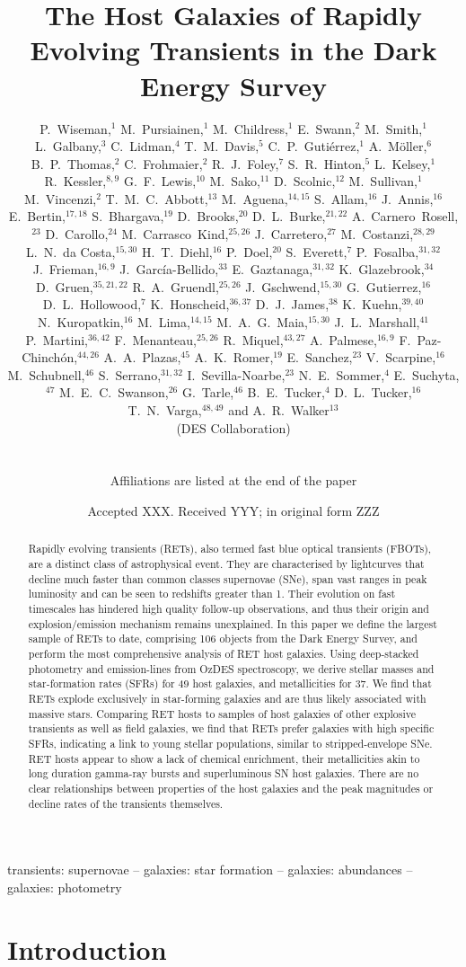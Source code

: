 \documentclass[fleqn,usenatbib,]{mnras}
\title[RET host galaxies in DES]{The Host Galaxies of Rapidly Evolving Transients in the Dark Energy Survey}
\author[P. S. Wiseman]{
\parbox{\textwidth}{
\Large
P.~Wiseman,$^{1}$
M.~Pursiainen,$^{1}$
M.~Childress,$^{1}$
E.~Swann,$^{2}$
M.~Smith,$^{1}$
L.~Galbany,$^{3}$
C.~Lidman,$^{4}$
T.~M.~Davis,$^{5}$
C.~P.~Guti\'errez,$^{1}$
A.~M\"oller,$^{6}$
B.~P.~Thomas,$^{2}$
C.~Frohmaier,$^{2}$
R.~J.~Foley,$^{7}$
S.~R.~Hinton,$^{5}$
L.~Kelsey,$^{1}$
R.~Kessler,$^{8,9}$
G.~F.~Lewis,$^{10}$
M.~Sako,$^{11}$
D.~Scolnic,$^{12}$
M.~Sullivan,$^{1}$
M.~Vincenzi,$^{2}$
T.~M.~C.~Abbott,$^{13}$
M.~Aguena,$^{14,15}$
S.~Allam,$^{16}$
J.~Annis,$^{16}$
E.~Bertin,$^{17,18}$
S.~Bhargava,$^{19}$
D.~Brooks,$^{20}$
D.~L.~Burke,$^{21,22}$
A.~Carnero~Rosell,$^{23}$
D.~Carollo,$^{24}$
M.~Carrasco~Kind,$^{25,26}$
J.~Carretero,$^{27}$
M.~Costanzi,$^{28,29}$
L.~N.~da Costa,$^{15,30}$
H.~T.~Diehl,$^{16}$
P.~Doel,$^{20}$
S.~Everett,$^{7}$
P.~Fosalba,$^{31,32}$
J.~Frieman,$^{16,9}$
J.~Garc\'ia-Bellido,$^{33}$
E.~Gaztanaga,$^{31,32}$
K.~Glazebrook,$^{34}$
D.~Gruen,$^{35,21,22}$
R.~A.~Gruendl,$^{25,26}$
J.~Gschwend,$^{15,30}$
G.~Gutierrez,$^{16}$
D.~L.~Hollowood,$^{7}$
K.~Honscheid,$^{36,37}$
D.~J.~James,$^{38}$
K.~Kuehn,$^{39,40}$
N.~Kuropatkin,$^{16}$
M.~Lima,$^{14,15}$
M.~A.~G.~Maia,$^{15,30}$
J.~L.~Marshall,$^{41}$
P.~Martini,$^{36,42}$
F.~Menanteau,$^{25,26}$
R.~Miquel,$^{43,27}$
A.~Palmese,$^{16,9}$
F.~Paz-Chinch\'{o}n,$^{44,26}$
A.~A.~Plazas,$^{45}$
A.~K.~Romer,$^{19}$
E.~Sanchez,$^{23}$
V.~Scarpine,$^{16}$
M.~Schubnell,$^{46}$
S.~Serrano,$^{31,32}$
I.~Sevilla-Noarbe,$^{23}$
N.~E.~Sommer,$^{4}$
E.~Suchyta,$^{47}$
M.~E.~C.~Swanson,$^{26}$
G.~Tarle,$^{46}$
B.~E.~Tucker,$^{4}$
D.~L.~Tucker,$^{16}$
T.~N.~Varga,$^{48,49}$
and A.~R.~Walker$^{13}$
\begin{center} (DES Collaboration) \end{center}
}
\vspace{0.4cm}
\\
\parbox{\textwidth}{Affiliations are listed at the end of the paper}
}
\date{Accepted XXX. Received YYY; in original form ZZZ}
\begin{document}
\label{firstpage}
\pagerange{\pageref{firstpage}--\pageref{lastpage}}
\maketitle

\begin{abstract}
Rapidly evolving transients (RETs), also termed fast blue optical transients (FBOTs), are a distinct class of astrophysical event. They are characterised by lightcurves that decline much faster than common classes supernovae (SNe), span vast ranges in peak luminosity and can be seen to redshifts greater than 1. Their evolution on fast timescales has hindered high quality follow-up observations, and thus their origin and explosion/emission mechanism remains unexplained. In this paper we define the largest sample of RETs to date, comprising 106 objects from the Dark Energy Survey, and perform the most comprehensive analysis of RET host galaxies. Using deep-stacked photometry and emission-lines from OzDES spectroscopy, we derive stellar masses and star-formation rates (SFRs) for 49 host galaxies, and metallicities for 37. We find that RETs explode exclusively in star-forming galaxies and are thus likely associated with massive stars. Comparing RET hosts to samples of host galaxies of other explosive transients as well as field galaxies, we find that RETs prefer galaxies with high specific SFRs, indicating a link to young stellar populations, similar to stripped-envelope SNe. RET hosts appear to show a lack of chemical enrichment, their metallicities akin to long duration gamma-ray bursts and superluminous SN host galaxies. There are no clear relationships between properties of the host galaxies and the peak magnitudes or decline rates of the transients themselves.

\end{abstract}

\begin{keywords}
transients: supernovae -- galaxies: star formation -- galaxies: abundances -- galaxies: photometry 
\end{keywords}



\section{Introduction}
\end{document}
